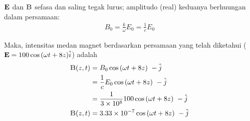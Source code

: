 $\vE$ dan $\vB$ sefasa dan saling tegak lurus; amplitudo (real) keduanya berhuungan dalam persamaan:
\begin{align*}
    B_0=\frac{k}{\omega}E_0=\frac{1}{c}E_0
\end{align*}

Maka, intensitas medan magnet berdasarkan persamaan yang telah diketahui ($\vE =100 \cos{(\omega t +8 z)\hat{i}}$) adalah
\begin{align*}
    \vB(z,t)&=B_0 \cos{(\omega t +8 z)}\ -\hat{j}\\
    &=\frac{1}{c}E_0 \cos{(\omega t +8 z)}\ -\hat{j}\\
    &=\frac{1}{3\times 10^8}100 \cos{(\omega t +8 z)}\ -\hat{j}\\
    \vB(z,t)&=3.33 \times 10^{-7} \cos{(\omega t +8 z)}\ -\hat{j}
\end{align*}